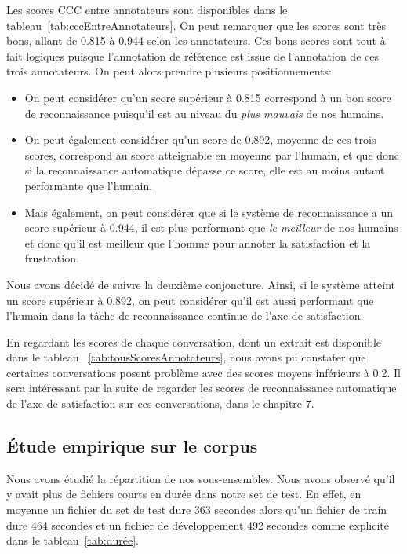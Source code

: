 Les scores CCC entre annotateurs sont disponibles dans le tableau~\ref{tab:cccEntreAnnotateurs}. On peut remarquer que les scores sont très bons, allant de 0.815 à 0.944 selon les annotateurs. Ces bons scores sont tout à fait logiques puisque l'annotation de référence est issue de l'annotation de ces trois annotateurs. On peut alors prendre plusieurs positionnements:
\begin{itemize}
  \item On peut considérer qu'un score supérieur à 0.815 correspond à un bon score de reconnaissance puisqu'il est au niveau du \textit{plus mauvais} de nos humains.
  \item On peut également considérer qu'un score de 0.892, moyenne de ces trois scores, correspond au score atteignable en moyenne par l'humain, et que donc si la reconnaissance automatique dépasse ce score, elle est au moins autant performante que l'humain.
  \item Mais également, on peut considérer que si le système de reconnaissance a un score supérieur à 0.944, il est plus performant que \textit{le meilleur} de nos humains et donc qu'il est meilleur que l'homme pour annoter la satisfaction et la frustration.
\end{itemize}

Nous avons décidé de suivre la deuxième conjoncture. Ainsi, si le système atteint un score supérieur à 0.892, on peut considérer qu'il est aussi performant que l'humain dans la tâche de reconnaissance continue de l'axe de satisfaction.

En regardant les scores de chaque conversation, dont un extrait est disponible dans le tableau ~\ref{tab:tousScoresAnnotateurs}, nous avons pu constater que certaines conversations posent problème avec des scores moyens inférieurs à 0.2. Il sera intéressant par la suite de regarder les scores de reconnaissance automatique de l'axe de satisfaction sur ces conversations, dans le chapitre 7.%



\subsection{Étude empirique sur le corpus}

Nous avons étudié la répartition de nos sous-ensembles. Nous avons observé qu'il y avait plus de fichiers courts en durée dans notre set de test. En effet, en moyenne un fichier du set de test dure 363 secondes alors qu'un fichier de train dure 464 secondes et un fichier de développement 492 secondes comme explicité dans le tableau~\ref{tab:durée}.


